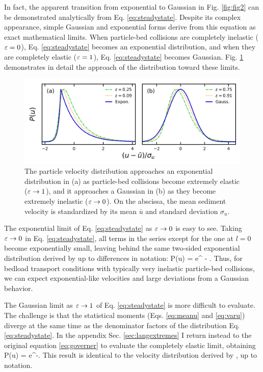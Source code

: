 In fact, the apparent transition from exponential to Gaussian in Fig. \ref{fig:fig2} can be demonstrated analytically from Eq. \ref{eq:steadystate}. Despite its complex appearance, simple Gaussian and exponential forms derive from this equation as exact mathematical limits.
When particle-bed collisions are completely inelastic ($\varepsilon = 0$), Eq. \ref{eq:steadystate} becomes an exponential distribution, and when they are completely elastic ($\varepsilon = 1$), Eq. \ref{eq:steadystate} becomes Gaussian.
Fig. \ref{fig:fig3} demonstrates in detail the approach of the distribution toward these limits.
\begin{figure}
	\centerline{\includegraphics{./figures/ch5/Fig3asymptotic.png}}
	\caption{The particle velocity distribution approaches an exponential distribution in (a) as particle-bed collisions become extremely elastic ($\varepsilon \rightarrow 1$), and it approaches a Gaussian in (b) as they become extremely inelastic ($\varepsilon \rightarrow 0$). On the abscissa, the mean sediment velocity is standardized by its mean $\bar{u}$ and standard deviation $\sigma_u$. }
	\label{fig:fig3}
\end{figure}

The exponential limit of Eq. \ref{eq:steadystate} as $\varepsilon \rightarrow 0$ is easy to see. Taking $\varepsilon \rightarrow 0 $ in Eq. \ref{eq:steadystate}, all terms in the series except for the one at $l=0$ become exponentially small, leaving behind the same two-sided exponential distribution derived by \cite{Fan2014} up to differences in notation:
\be P(u) = e^{ - }. \ee
Thus, for bedload transport conditions with typically very inelastic particle-bed collisions, we can expect exponential-like velocities and large deviations from a Gaussian behavior.

The Gaussian limit as $\varepsilon \rightarrow 1$ of Eq. \ref{eq:steadystate} is more difficult to evaluate. The challenge is that the statistical moments (Eqs. \ref{eq:meanu} and \ref{eq:varu}) diverge at the same time as the denominator factors of the distribution Eq. \ref{eq:steadystate}. In the appendix Sec. \ref{sec:langextremes} I return instead to the original equation \ref{eq:governer} to evaluate the completely elastic limit, obtaining
\be P(u) = e^{-}. \label{eq:gaussian}\ee
This result is identical to the velocity distribution derived by \citet{Ancey2014}, up to notation.

